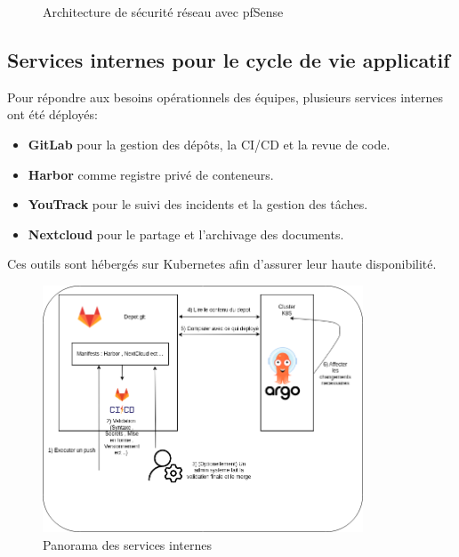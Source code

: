 \begin{figure}[H]
	\centering
	\caption{Architecture de sécurité réseau avec pfSense}
\end{figure}

\subsection{Services internes pour le cycle de vie applicatif}

Pour répondre aux besoins opérationnels des équipes, plusieurs services internes ont été déployés:
\begin{itemize}
	\item \textbf{GitLab} pour la gestion des dépôts, la CI/CD et la revue de code.
	\item \textbf{Harbor} comme registre privé de conteneurs.
	\item \textbf{YouTrack} pour le suivi des incidents et la gestion des tâches.
	\item \textbf{Nextcloud} pour le partage et l’archivage des documents.
\end{itemize}

Ces outils sont hébergés sur Kubernetes afin d’assurer leur haute disponibilité.

\begin{figure}[H]
	\centering
	\includegraphics[width=0.85\textwidth]{figures/services-internes.png}
	\caption{Panorama des services internes}
\end{figure}

